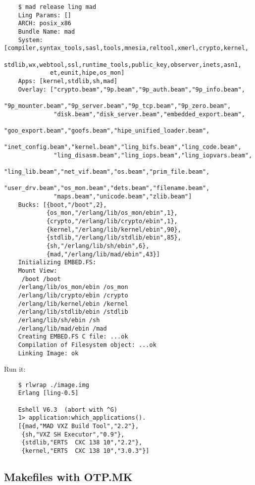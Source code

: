 \vspace{1\baselineskip}
\begin{lstlisting}
    $ mad release ling mad
    Ling Params: []
    ARCH: posix_x86
    Bundle Name: mad
    System: [compiler,syntax_tools,sasl,tools,mnesia,reltool,xmerl,crypto,kernel,
             stdlib,wx,webtool,ssl,runtime_tools,public_key,observer,inets,asn1,
             et,eunit,hipe,os_mon]
    Apps: [kernel,stdlib,sh,mad]
    Overlay: ["crypto.beam","9p.beam","9p_auth.beam","9p_info.beam",
              "9p_mounter.beam","9p_server.beam","9p_tcp.beam","9p_zero.beam",
              "disk.beam","disk_server.beam","embedded_export.beam",
              "goo_export.beam","goofs.beam","hipe_unified_loader.beam",
              "inet_config.beam","kernel.beam","ling_bifs.beam","ling_code.beam",
              "ling_disasm.beam","ling_iops.beam","ling_iopvars.beam",
              "ling_lib.beam","net_vif.beam","os.beam","prim_file.beam",
              "user_drv.beam","os_mon.beam","dets.beam","filename.beam",
              "maps.beam","unicode.beam","zlib.beam"]
    Bucks: [{boot,"/boot",2},
            {os_mon,"/erlang/lib/os_mon/ebin",1},
            {crypto,"/erlang/lib/crypto/ebin",1},
            {kernel,"/erlang/lib/kernel/ebin",90},
            {stdlib,"/erlang/lib/stdlib/ebin",85},
            {sh,"/erlang/lib/sh/ebin",6},
            {mad,"/erlang/lib/mad/ebin",43}]
    Initializing EMBED.FS:
    Mount View:
     /boot /boot
    /erlang/lib/os_mon/ebin /os_mon
    /erlang/lib/crypto/ebin /crypto
    /erlang/lib/kernel/ebin /kernel
    /erlang/lib/stdlib/ebin /stdlib
    /erlang/lib/sh/ebin /sh
    /erlang/lib/mad/ebin /mad
    Creating EMBED.FS C file: ...ok
    Compilation of Filesystem object: ...ok
    Linking Image: ok
\end{lstlisting}
\vspace{1\baselineskip}

Run it:

\vspace{1\baselineskip}
\begin{lstlisting}
    $ rlwrap ./image.img
    Erlang [ling-0.5]

    Eshell V6.3  (abort with ^G)
    1> application:which_applications().
    [{mad,"MAD VXZ Build Tool","2.2"},
     {sh,"VXZ SH Executor","0.9"},
     {stdlib,"ERTS  CXC 138 10","2.2"},
     {kernel,"ERTS  CXC 138 10","3.0.3"}]
\end{lstlisting}
\vspace{1\baselineskip}

\subsection{Makefiles with OTP.MK}

